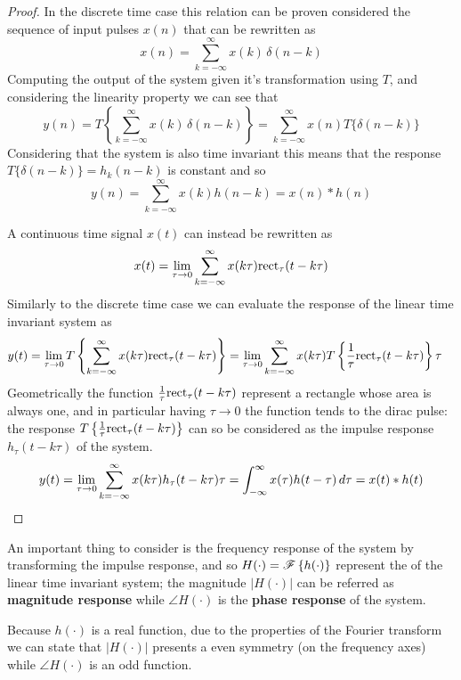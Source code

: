 	\begin{proof}
		In the discrete time case this relation can be proven considered the sequence of input pulses $x(n)$ that can be rewritten as
		\[ x(n) = \sum_{k=-\infty}^\infty x(k)\, \delta(n-k) \]
		Computing the output of the system given  it's transformation using $T$, and considering the linearity property we can see that
		\[ y(n) = T \left\{ \sum_{k=-\infty}^\infty x(k)\, \delta(n-k)  \right\} = \sum_{k=-\infty}^\infty x(n) T\big\{ \delta (n-k) \big\} \]
		Considering that the system is also time invariant this means that the response $T\big\{ \delta (n-k) \big\} = h_k(n-k)$ is constant and so
		\[ y(n) = \sum_{k=-\infty}^\infty x(k) h(n-k) = x(n) * h(n) \]\vspace{3mm}
		
		A continuous time signal $x(t)$ can instead be rewritten as
		\[ x(t) = \lim_{\tau\rightarrow0} \sum_{k=-\infty}^{\infty} x(k\tau) \textrm{rect}_\tau(t-k\tau) \]
		Similarly to the discrete time case we can evaluate the response of the linear time invariant system as
		\begin{align*}
			y(t) & = \lim_{\tau\rightarrow0} T\left\{ \sum_{k=-\infty}^{\infty} x(k\tau) \textrm{rect}_\tau(t-k\tau) \right\} = \lim_{\tau\rightarrow0} \sum_{k=-\infty}^{\infty} x(k\tau) T \left\{ \frac 1 \tau \textrm{rect}_\tau(t-k\tau) \right\}\tau 
		\end{align*}
		Geometrically the function $\frac 1 \tau \textrm{rect}_\tau(t-k\tau)$ represent a rectangle whose area is always one, and in particular having $\tau\rightarrow 0$ the function tends to the dirac pulse: the response $T\left\{\frac 1 \tau \textrm{rect}_\tau(t-k\tau)\right\}$ can so be considered as the impulse response $h_\tau(t-k\tau)$ of the system.
		\[ y(t) = \lim_{\tau\rightarrow0} \sum_{k=-\infty}^{\infty} x(k\tau) h_\tau(t- k\tau) \tau = \int_{-\infty}^\infty x(\tau) h(t-\tau)\, d\tau = x(t)*h(t)  \]
	\end{proof}
	
	An important thing to consider is the frequency response of the system by transforming the impulse response, and so $H(\cdot) = \mathscr{F}\left\{ h(\cdot) \right\}$ represent the  of the linear time invariant system; the magnitude $|H(\cdot)|$ can be referred as \textbf{magnitude response} while $\angle H(\cdot)$ is the \textbf{phase response} of the system.
	
	Because $h(\cdot)$ is a real function, due to the properties of the Fourier transform we can state that $|H(\cdot)|$ presents a even symmetry (on the frequency axes) while $\angle H(\cdot)$ is an odd function. 
	
